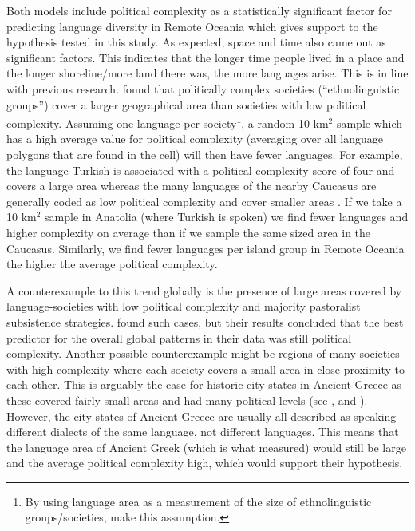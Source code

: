 \documentclass[a4paper,10pt]{article} %
\begin{document}
Both models include political complexity as a statistically significant factor for predicting language diversity in Remote Oceania which gives support to the hypothesis tested in this study. As expected, space and time also came out as significant factors. This indicates that the longer time people lived in a place and the longer shoreline/more land there was, the more languages arise. This is in line with previous research. \citet{curriemace2009} found that politically complex societies (``ethnolinguistic groups'') cover a larger geographical area than societies with low political complexity.  Assuming one language per society\footnote{By using language area as a measurement of the size of ethnolinguistic groups/societies, \citet{curriemace2009} make this assumption.}, a random 10 km$^2$ sample which has a high average value for political complexity (averaging over all language polygons that are found in the cell) will then have fewer languages. For example, the language Turkish is associated with a political complexity score of four \citep{d_place_all} and covers a large area whereas the many languages of the nearby Caucasus are generally coded as low political complexity and cover smaller areas \citep{ethnologue2005}. If we take a 10 km$^2$ sample in Anatolia (where Turkish is spoken) we find fewer languages and higher complexity on average than if we sample the same sized area in the Caucasus. Similarly, we find fewer languages per island group in Remote Oceania the higher the average political complexity.

A counterexample to this trend globally is the presence of large areas covered by language-societies with low political complexity and majority pastoralist subsistence strategies. \citet{curriemace2009} found such cases, but their results concluded that the best predictor for the overall global patterns in their data was still political complexity. Another possible counterexample might be regions of many societies with high complexity where each society covers a small area in close proximity to each other. This is arguably the case for historic city states in Ancient Greece as these covered fairly small areas and had many political levels (see \citet{cartwright_2013}, and \citet[19]{sealey1976history}). However, the city states of Ancient Greece are usually all described as speaking different dialects of the same language, not different languages. This means that the language area of Ancient Greek (which is what \citet{curriemace2009} measured) would still be large and the average political complexity high, which would support their hypothesis.
\end{document}
